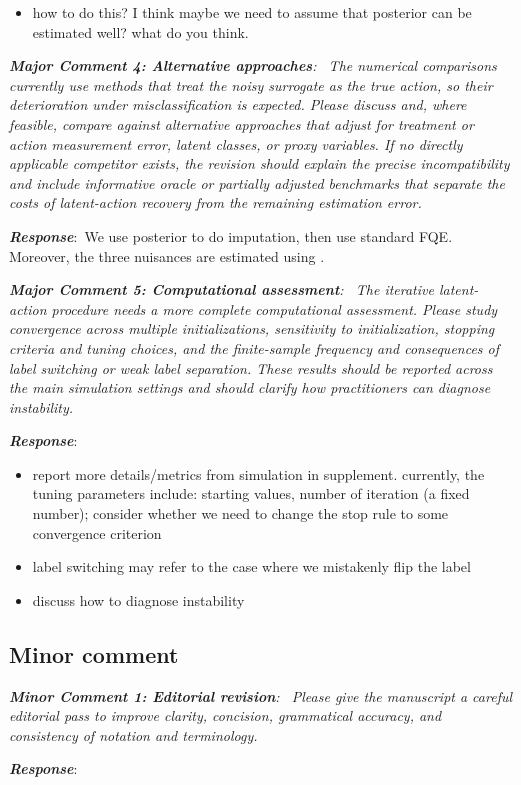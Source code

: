 \documentclass[12pt]{article}
\newcommand{\0}{\boldsymbol{0}}
\theoremstyle{definition}
\newcommand{\reviewcomment}[1]{\par\begingroup\itshape\noindent\textbf{#1}:\ }
\newcommand{\reviewresponse}{\par\endgroup\noindent\textbf{\textit{Response}}:\ }
\begin{document}
\begin{itemize}
    \item how to do this? I think maybe we need to assume that posterior can be estimated well? what do you think.
\end{itemize}

\reviewcomment{Major Comment 4: Alternative approaches} The numerical comparisons currently use methods that treat the noisy surrogate as the true action, so their deterioration under misclassification is expected. Please discuss and, where feasible, compare against alternative approaches that adjust for treatment or action measurement error, latent classes, or proxy variables. If no directly applicable competitor exists, the revision should explain the precise incompatibility and include informative oracle or partially adjusted benchmarks that separate the costs of latent-action recovery from the remaining estimation error.
\reviewresponse We use posterior to do imputation, then use standard FQE. Moreover, the three nuisances are estimated using \citet{hu2008identification}.

\reviewcomment{Major Comment 5: Computational assessment} The iterative latent-action procedure needs a more complete computational assessment. Please study convergence across multiple initializations, sensitivity to initialization, stopping criteria and tuning choices, and the finite-sample frequency and consequences of label switching or weak label separation. These results should be reported across the main simulation settings and should clarify how practitioners can diagnose instability.
\reviewresponse
\begin{itemize}
    \item report more details/metrics from simulation in supplement. currently, the tuning parameters include: starting values, number of iteration (a fixed number); consider whether we need to change the stop rule to some convergence criterion
    \item label switching may refer to the case where we mistakenly flip the label
    \item discuss how to diagnose instability
\end{itemize}

\subsection*{Minor comment}

\reviewcomment{Minor Comment 1: Editorial revision} Please give the manuscript a careful editorial pass to improve clarity, concision, grammatical accuracy, and consistency of notation and terminology.
\reviewresponse
\end{document}
